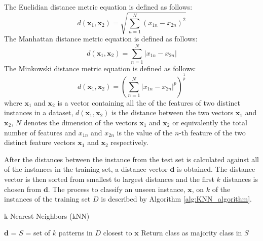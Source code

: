 \documentclass[10pt, conference]{IEEEtran}
\begin{document}
The Euclidian distance metric equation is defined as follows:
\begin{equation}
    d(\boldsymbol{\textbf{x}}_1, \boldsymbol{\textbf{x}}_2) = \sqrt{\sum_{n=1}^{N}(x_{1n} - x_{2n})^2} \label{euclidian}
\end{equation}
The Manhattan distance metric equation is defined as follows:
\begin{equation}
    d(\boldsymbol{\textbf{x}}_1, \boldsymbol{\textbf{x}}_2) = \sum_{n=1}^{N} \left| x_{1n} - x_{2n} \right| \label{manhattan}
\end{equation}
The Minkowski distance metric equation is defined as follows:
\begin{equation}
    d(\boldsymbol{\textbf{x}}_1, \boldsymbol{\textbf{x}}_2) = \left(\sum_{n=1}^{N} \left| x_{1n} - x_{2n} \right|^p\right)^\frac{1}{p} \label{minkowski}
\end{equation}
where $\boldsymbol{\textbf{x}}_1$ and $\boldsymbol{\textbf{x}}_2$ is a vector containing all the of the features of two
distinct instances in a dataset, $d(\boldsymbol{\textbf{x}}_1, \boldsymbol{\textbf{x}}_2)$ is the distance between the two
vectors $\boldsymbol{\textbf{x}}_1$ and $\boldsymbol{\textbf{x}}_2$, $N$ denotes the dimension of the vectors 
$\boldsymbol{\textbf{x}}_1$ and $\boldsymbol{\textbf{x}}_2$ or equivalently the total number of features and $x_{1n}$ and
$x_{2n}$ is the value of the $n$-th feature of the two distinct feature vectors $\boldsymbol{\textbf{x}}_1$ and
$\boldsymbol{\textbf{x}}_2$ respectively.

After the distances between the instance from the test set is calculated against all of the instances in the training set,
a distance vector $\boldsymbol{\textbf{d}}$ is obtained. The distance vector is then sorted from smallest to largest distances
and the first $k$ distances is chosen from $\boldsymbol{\textbf{d}}$. The process to classify an unseen instance,
$\boldsymbol{\textbf{x}}$, on $k$ of the instances of the training set $D$ is described by Algorithm \ref{alg:KNN_algorithm}.
\begin{algorithm}
\caption{k-Nearest Neighbors (kNN)}
\label{alg:KNN_algorithm}
\begin{algorithmic}[1]
            \State $\boldsymbol{\textbf{d}}$ = 
        \EndFor
        \State {}
        \State $S$ = set of $k$ patterns in $D$ closest to $\boldsymbol{\textbf{x}}$
        \State Return class as majority class in $S$
    \EndFunction
\end{algorithmic}
\end{algorithm}
\end{document}
